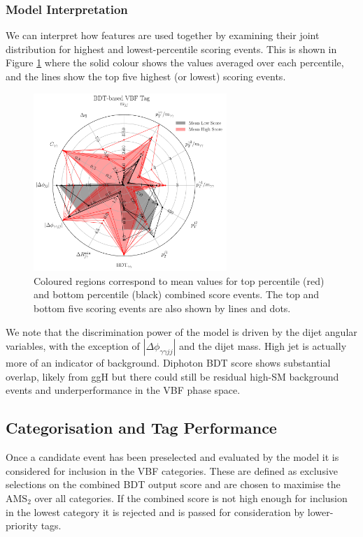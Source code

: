 \subsubsection{Model Interpretation}
We can interpret how features are used together by examining their joint distribution for highest and lowest-percentile scoring events. 
This is shown in Figure \ref{fig:event_categorisaton:bdt_based_vbf_tag_interpretation} where the solid colour shows the values averaged over each percentile, and the lines show the top five highest (or lowest) scoring events.
\begin{figure}[h!]
    \includegraphics[width=0.65\textwidth]{figures/event_selection/eng_feature_radar_BDT.pdf}
    \caption{Coloured regions correspond to mean values for top percentile (red) and bottom percentile (black) combined score events. 
             The top and bottom five scoring events are also shown by lines and dots.}
    \label{fig:event_categorisaton:bdt_based_vbf_tag_interpretation}
\end{figure}

We note that the discrimination power of the model is driven by the dijet angular variables, with the exception of $|\Delta\phi_{\gamma\gamma{jj}}|$ and the dijet mass.
High jet \pt is actually more of an indicator of background.
Diphoton BDT score shows substantial overlap, likely from ggH but there could still be residual high-\pt SM background events and underperformance in the VBF phase space.


\subsection{Categorisation and Tag Performance}
Once a candidate event has been preselected and evaluated by the model it is considered for inclusion in the VBF categories. 
These are defined as exclusive selections on the combined BDT output score and are chosen to maximise the $\mathrm{AMS}_2$ over all categories. 
If the combined score is not high enough for inclusion in the lowest category it is rejected and is passed for consideration by lower-priority tags. 

